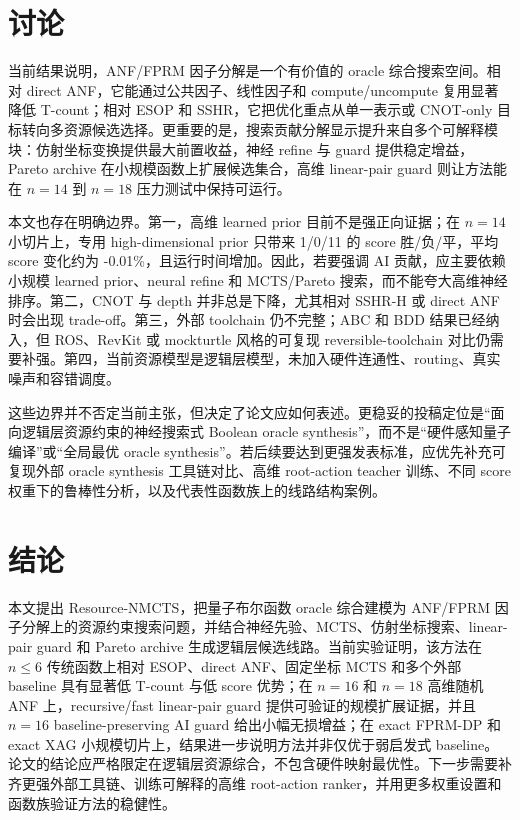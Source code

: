 \documentclass[UTF8,fontset=macnew,11pt]{ctexart}
\newcommand{\method}{Resource-NMCTS}
\begin{document}
\section{讨论}

当前结果说明，ANF/FPRM 因子分解是一个有价值的 oracle 综合搜索空间。相对 direct ANF，它能通过公共因子、线性因子和 compute/uncompute 复用显著降低 T-count；相对 ESOP 和 SSHR，它把优化重点从单一表示或 CNOT-only 目标转向多资源候选选择。更重要的是，搜索贡献分解显示提升来自多个可解释模块：仿射坐标变换提供最大前置收益，神经 refine 与 guard 提供稳定增益，Pareto archive 在小规模函数上扩展候选集合，高维 linear-pair guard 则让方法能在 $n=14$ 到 $n=18$ 压力测试中保持可运行。

本文也存在明确边界。第一，高维 learned prior 目前不是强正向证据；在 $n=14$ 小切片上，专用 high-dimensional prior 只带来 1/0/11 的 score 胜/负/平，平均 score 变化约为 -0.01\%，且运行时间增加。因此，若要强调 AI 贡献，应主要依赖小规模 learned prior、neural refine 和 MCTS/Pareto 搜索，而不能夸大高维神经排序。第二，CNOT 与 depth 并非总是下降，尤其相对 SSHR-H 或 direct ANF 时会出现 trade-off。第三，外部 toolchain 仍不完整；ABC 和 BDD 结果已经纳入，但 ROS、RevKit 或 mockturtle 风格的可复现 reversible-toolchain 对比仍需要补强。第四，当前资源模型是逻辑层模型，未加入硬件连通性、routing、真实噪声和容错调度。

这些边界并不否定当前主张，但决定了论文应如何表述。更稳妥的投稿定位是“面向逻辑层资源约束的神经搜索式 Boolean oracle synthesis”，而不是“硬件感知量子编译”或“全局最优 oracle synthesis”。若后续要达到更强发表标准，应优先补充可复现外部 oracle synthesis 工具链对比、高维 root-action teacher 训练、不同 score 权重下的鲁棒性分析，以及代表性函数族上的线路结构案例。

\section{结论}

本文提出 \method{}，把量子布尔函数 oracle 综合建模为 ANF/FPRM 因子分解上的资源约束搜索问题，并结合神经先验、MCTS、仿射坐标搜索、linear-pair guard 和 Pareto archive 生成逻辑层候选线路。当前实验证明，该方法在 $n\leq 6$ 传统函数上相对 ESOP、direct ANF、固定坐标 MCTS 和多个外部 baseline 具有显著低 T-count 与低 score 优势；在 $n=16$ 和 $n=18$ 高维随机 ANF 上，recursive/fast linear-pair guard 提供可验证的规模扩展证据，并且 $n=16$ baseline-preserving AI guard 给出小幅无损增益；在 exact FPRM-DP 和 exact XAG 小规模切片上，结果进一步说明方法并非仅优于弱启发式 baseline。论文的结论应严格限定在逻辑层资源综合，不包含硬件映射最优性。下一步需要补齐更强外部工具链、训练可解释的高维 root-action ranker，并用更多权重设置和函数族验证方法的稳健性。
\end{document}
